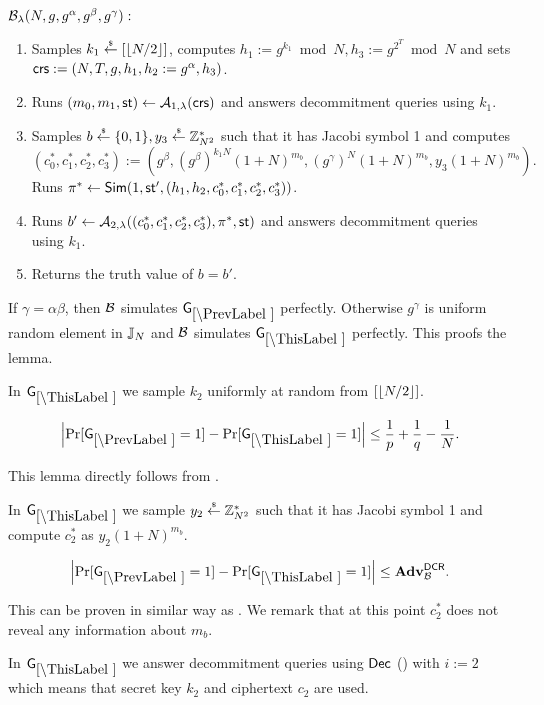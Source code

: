 $\mathcal{B}_{\lambda}(N,g,g^\alpha, g^\beta, g^\gamma):$
\vspace{-2mm}
\begin{enumerate}
\item Samples $k_1 \stackrel{{\scriptscriptstyle\$}}{\leftarrow} [\left\lfloor N/2 \right\rfloor]$, computes $h_1 := g^{k_1} \bmod N,  h_3 := g^{2^{T}} \bmod N$ and sets $\mathsf{crs}:=(N, T, g, h_1, h_2:=g^\alpha, h_3)$.
\item Runs $(m_0, m_1, \mathsf{st}) \leftarrow \mathcal{A}_{1, \lambda}(\mathsf{crs})$ and answers decommitment queries using $k_1$.
\item Samples $b \stackrel{{\scriptscriptstyle\$}}{\leftarrow} \{0,1\}, y_3 \stackrel{{\scriptscriptstyle\$}}{\leftarrow} \mathbb{Z}_{N^2}^*$ such that it has Jacobi symbol 1 and computes $(c_0^*, c_1^*, c_2^*, c_3^*):=(g^\beta, (g^\beta)^{k_1 N}(1+N)^{m_b}, (g^{\gamma})^N(1+N)^{m_b}, y_3(1+N)^{m_b}).$ Runs $\pi^* \leftarrow \mathsf{Sim}(1, \mathsf{st}', (h_1, h_2, c_0^*, c_1^*, c_2^*, c_3^*))$.
\item Runs $b' \leftarrow \mathcal{A}_{2, \lambda}((c_0^*, c_1^*, c_2^*,c_3^*), \pi^*, \mathsf{st})$ and answers decommitment queries using $k_1$.
\item Returns the truth value of $b=b'$.
\end{enumerate}
If $\gamma = \alpha\beta$, then $\mathcal{B}$ simulates $\games_\prevgame$ perfectly. Otherwise $g^\gamma$ is uniform random element in $\mathbb{J}_N$ and $\mathcal{B}$ simulates $\games_\thisgame$ perfectly. This proofs the lemma.

In $\games_\thisgame$ we sample $k_2$ uniformly at random from $[\left\lfloor N/2 \right\rfloor]$. 

\begin{lemma}
\[
\left|\Pr[\games_\prevgame = 1] - \Pr[\games_\thisgame = 1]\right| \leq \frac{1}{p}+\frac{1}{q}-\frac{1}{N}.
\]
\end{lemma}

This lemma directly follows from .

In $\games_\thisgame$ we sample $y_2 \stackrel{{\scriptscriptstyle\$}}{\leftarrow} \mathbb{Z}_{N^2}^*$ such that it has Jacobi symbol 1 and compute $c_2^*$ as $y_2(1+N)^{m_b}$. 

\begin{lemma}
\[
\left|\Pr[\games_\prevgame = 1] - \Pr[\games_\thisgame = 1]\right| \leq \advtg_\advB^\dcr.
\]
\end{lemma}
This can be proven in similar way as . We remark that at this point $c_2^*$ does not reveal any information about $m_b$.




In $\games_\thisgame$ we answer decommitment queries using $\mathsf{Dec}$ () with $i:=2$ which means that secret key $k_2$ and ciphertext $c_2$ are used. 

